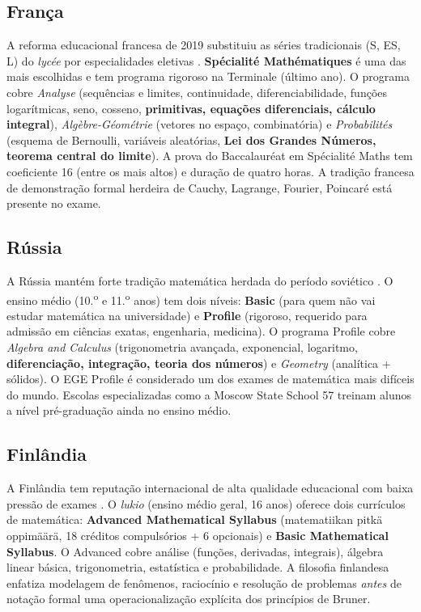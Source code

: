 \documentclass[12pt,a4paper,oneside]{article}
\begin{document}
\subsection{França}

A reforma educacional francesa de 2019 substituiu as séries
tradicionais (S, ES, L) do \emph{lycée} por especialidades eletivas
\cite{ref:eduscol-spe-maths,ref:annabac}. \textbf{Spécialité
Mathématiques} é uma das mais escolhidas e tem programa rigoroso
na Terminale (último ano). O programa cobre \emph{Analyse}
(sequências e limites, continuidade, diferenciabilidade, funções
logarítmicas, seno, cosseno, \textbf{primitivas, equações
diferenciais, cálculo integral}), \emph{Algèbre-Géométrie} (vetores
no espaço, combinatória) e \emph{Probabilités} (esquema de
Bernoulli, variáveis aleatórias, \textbf{Lei dos Grandes Números,
teorema central do limite}). A prova do Baccalauréat em Spécialité
Maths tem coeficiente 16 (entre os mais altos) e duração de quatro
horas. A tradição francesa de demonstração formal \textemdash{}
herdeira de Cauchy, Lagrange, Fourier, Poincaré \textemdash{} está
presente no exame.

\subsection{Rússia}

A Rússia mantém forte tradição matemática herdada do período
soviético \cite{ref:ege-wiki,ref:timss-russia,ref:moscow-school57}.
O ensino médio (10.\textsuperscript{o} e 11.\textsuperscript{o}
anos) tem dois níveis: \textbf{Basic} (para quem não vai estudar
matemática na universidade) e \textbf{Profile} (rigoroso,
requerido para admissão em ciências exatas, engenharia, medicina).
O programa Profile cobre \emph{Algebra and Calculus} (trigonometria
avançada, exponencial, logaritmo, \textbf{diferenciação,
integração, teoria dos números}) e \emph{Geometry} (analítica +
sólidos). O EGE Profile é considerado um dos exames de matemática
mais difíceis do mundo. Escolas especializadas como a Moscow State
School 57 treinam alunos a nível pré-graduação ainda no ensino
médio.

\subsection{Finlândia}

A Finlândia tem reputação internacional de alta qualidade
educacional com baixa pressão de exames
\cite{ref:opetus-finland,ref:eurydice-finland}. O \emph{lukio}
(ensino médio geral, 16 anos) oferece dois currículos
de matemática: \textbf{Advanced Mathematical Syllabus}
(matematiikan pitkä oppimäärä, 18 créditos compulsórios + 6
opcionais) e \textbf{Basic Mathematical Syllabus}. O Advanced
cobre análise (funções, derivadas, integrais), álgebra linear
básica, trigonometria, estatística e probabilidade. A filosofia
finlandesa enfatiza modelagem de fenômenos, raciocínio e resolução
de problemas \emph{antes} de notação formal \textemdash{} uma
operacionalização explícita dos princípios de Bruner.
\end{document}
